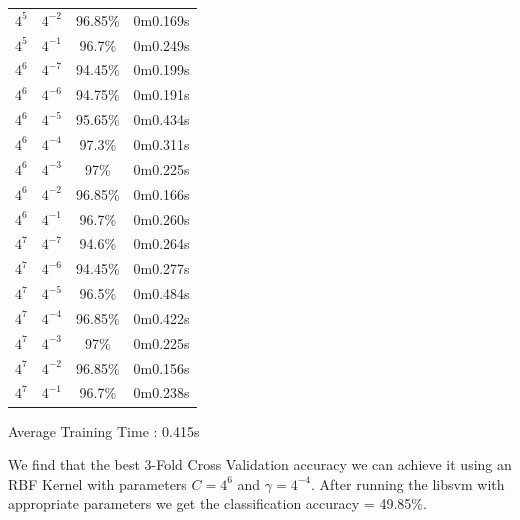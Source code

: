 \documentclass[]{report}
\begin{document}
\begin{center}
\begin{tabular}{l|l|c|c}
			 $4^{5}$  & $4^{-2}$   & 96.85\%                             & 0m0.169s         \\
			 $4^{5}$  & $4^{-1}$   & 96.7\%                              & 0m0.249s         \\
			 $4^{6}$  & $4^{-7}$   & 94.45\%                             & 0m0.199s         \\
			 $4^{6}$  & $4^{-6}$   & 94.75\%                             & 0m0.191s         \\
			 $4^{6}$  & $4^{-5}$   & 95.65\%                             & 0m0.434s         \\
			 $4^{6}$  & $4^{-4}$   & 97.3\%                              & 0m0.311s         \\
			 $4^{6}$  & $4^{-3}$   & 97\%                                & 0m0.225s         \\
			 $4^{6}$  & $4^{-2}$   & 96.85\%                             & 0m0.166s         \\
			 $4^{6}$  & $4^{-1}$   & 96.7\%                              & 0m0.260s         \\
			 $4^{7}$  & $4^{-7}$   & 94.6\%                              & 0m0.264s         \\
			 $4^{7}$  & $4^{-6}$   & 94.45\%                             & 0m0.277s         \\
			 $4^{7}$  & $4^{-5}$   & 96.5\%                              & 0m0.484s         \\
			 $4^{7}$  & $4^{-4}$   & 96.85\%                             & 0m0.422s         \\
			 $4^{7}$  & $4^{-3}$   & 97\%                                & 0m0.225s         \\
			 $4^{7}$  & $4^{-2}$   & 96.85\%                             & 0m0.156s         \\
			 $4^{7}$  & $4^{-1}$   & 96.7\%                              & 0m0.238s         \\
			 \hline
			\end{tabular}

	\end{center}

	Average Training Time : 0.415s \newline

	We find that the best 3-Fold Cross Validation accuracy we can achieve it using an RBF Kernel with parameters $C = 4^6$ and $\gamma = 4^{-4}$.
	After running the libsvm with appropriate parameters we get the classification accuracy = 49.85\%.
\end{document}
